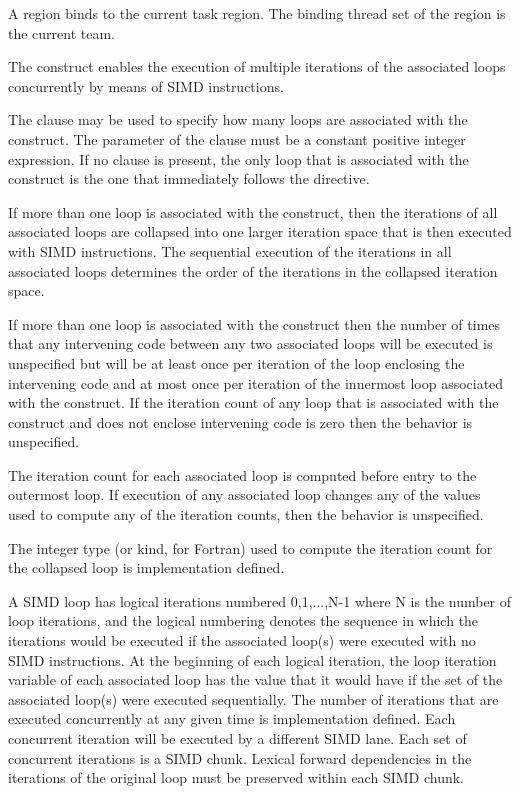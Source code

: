 \binding
A  region binds to the current task region. The binding thread set of the 
region is the current team.

\descr
The  construct enables the execution of multiple iterations of the associated loops
concurrently by means of SIMD instructions.

The  clause may be used to specify how many loops are associated with the
construct. The parameter of the  clause must be a constant positive integer
expression. If no  clause is present, the only loop that is associated with the
 construct is the one that immediately follows the directive.

If more than one loop is associated with the  construct, then the iterations of all
associated loops are collapsed into one larger iteration space that is then executed with
SIMD instructions. The sequential execution of the iterations in all associated loops
determines the order of the iterations in the collapsed iteration space.

If more than one loop is associated with the  construct
then the number of times that any intervening code between any two
associated loops will be executed is unspecified but will be at least
once per iteration of the loop enclosing the intervening code and at
most once per iteration of the innermost loop associated with the
construct.  If the iteration count of any loop that is associated with the 
construct and does not enclose intervening code is zero then the behavior
is unspecified.


The iteration count for each associated loop is computed before entry to the outermost
loop. If execution of any associated loop changes any of the values used to compute any
of the iteration counts, then the behavior is unspecified.

The integer type (or kind, for Fortran) used to compute the iteration count for the
collapsed loop is implementation defined.

A SIMD loop has logical iterations numbered 0,1,...,N-1 where N is the
number of loop iterations, and the logical numbering denotes the
sequence in which the iterations would be executed if the associated
loop(s) were executed with no SIMD instructions.  At the beginning of
each logical iteration, the loop iteration variable of each associated
loop has the value that it would have if the set of the associated
loop(s) were executed sequentially. The number of iterations that are
executed concurrently at any given time is implementation defined.
Each concurrent iteration will be executed by a different SIMD lane.
Each set of concurrent iterations is a SIMD chunk.  Lexical forward
dependencies in the iterations of the original loop must be preserved
within each SIMD chunk.

